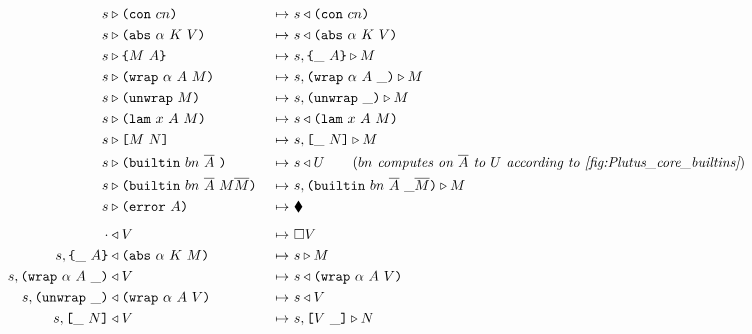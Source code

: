 \documentclass[../plutus-core-specification.tex]{subfiles}
\begin{document}
\begin{figure}[H]
\begin{subfigure}[c]{\linewidth}
\begin{alignat*}{2}
        \cksteps{\ckforward{s&}{\con{cn}}&} {&\ckbackward{s}{\con{cn}}}\\
        \cksteps{\ckforward{s&}{\abs{\alpha}{K}{V}}&} {&\ckbackward{s}{\abs{\alpha}{K}{V}}}\\
        \cksteps{\ckforward{s&}{\inst{M}{A}}&} {&\ckforward{s, \inInstLeftFrame{A}}{M}}\\
        \cksteps{\ckforward{s&}{\wrap{\alpha}{A}{M}}&} {&\ckforward{s, \inWrapRightFrame{\alpha}{A}}{M}}\\
        \cksteps{\ckforward{s&}{\unwrap{M}}&} {&\ckforward{s, \inUnwrapFrame{}}{M}}\\
        \cksteps{\ckforward{s&}{\lam{x}{A}{M}}&} {&\ckbackward{s}{\lam{x}{A}{M}}}\\
        \cksteps{\ckforward{s&}{\app{M}{N}}&} {&\ckforward{s, \inAppLeftFrame{N}}{M}}\\
        \cksteps{\ckforward{s&}{\builtin{bn}{\repetition{A}}{}}&} {&\ckbackward{s}{U}} \qquad (\textit{$bn$ computes on $\repetition{A}$ to $U$ according to \ref{fig:Plutus_core_builtins}})\\
        \cksteps{\ckforward{s&}{\builtin{bn}{\repetition{A}}{M \repetition{M}}}&} {&\ckforward{s, \inBuiltin{bn}{\repetition{A}}{}{\_}{\repetition{M}}}{M}}\\
        \cksteps{\ckforward{s&}{\error{A}}&} {&\ckerror{}}\\
        \\[-10pt] %
        \cksteps{\ckbackward{\cdot&}{V}&} {&\square V}\\
        \cksteps{\ckbackward{s, \inInstLeftFrame{A}&}{\abs{\alpha}{K}{M}}&} {&\ckforward{s}{M}}\\
        \cksteps{\ckbackward{s, \inWrapRightFrame{\alpha}{A}&}{V}&} {&\ckbackward{s}{\wrap{\alpha}{A}{V}}}\\
        \cksteps{\ckbackward{s, \inUnwrapFrame{}&}{\wrap{\alpha}{A}{V}}&} {&\ckbackward{s}{V}}\\
        \cksteps{\ckbackward{s, \inAppLeftFrame{N}&}{V}&} {&\ckforward{s, \inAppRightFrame{V}}{N}}\\

\end{alignat*}
\end{subfigure}
\end{figure}
\end{document}
